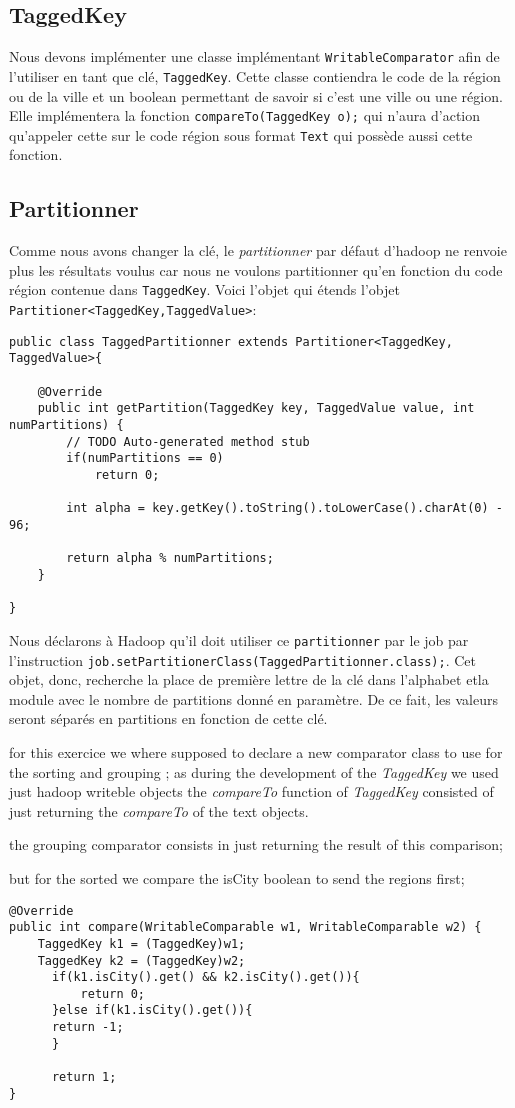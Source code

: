 \documentclass[a4paper]{article}
\begin{document}
\subsection{TaggedKey}
Nous devons implémenter une classe implémentant \verb?WritableComparator? afin de l'utiliser en tant que clé, \verb?TaggedKey?. Cette classe contiendra le code de la région ou de la ville et un boolean permettant de savoir si c'est une ville ou une région. Elle implémentera la fonction \verb?compareTo(TaggedKey o);? qui n'aura d'action qu'appeler cette sur le code région sous format \verb?Text? qui possède aussi cette fonction.

\subsection{Partitionner}
Comme nous avons changer la clé, le \textit{partitionner} par défaut d'hadoop ne renvoie plus les résultats voulus car nous ne voulons partitionner qu'en fonction du code région contenue dans \verb?TaggedKey?. Voici l'objet qui étends l'objet \verb?Partitioner<TaggedKey,TaggedValue>?:

\begin{lstlisting}
public class TaggedPartitionner extends Partitioner<TaggedKey, TaggedValue>{

	@Override
	public int getPartition(TaggedKey key, TaggedValue value, int numPartitions) {
		// TODO Auto-generated method stub
		if(numPartitions == 0)
			return 0;
		
		int alpha = key.getKey().toString().toLowerCase().charAt(0) - 96;
		
		return alpha % numPartitions;
	}

}
\end{lstlisting}

Nous déclarons à Hadoop qu'il doit utiliser ce \verb?partitionner? par le job par l'instruction \verb?job.setPartitionerClass(TaggedPartitionner.class);?. Cet objet, donc, recherche la place de première lettre de la clé dans l'alphabet etla module avec le nombre de partitions donné en paramètre. De ce fait, les valeurs seront séparés en partitions en fonction de cette clé.



for this exercice we where supposed to declare a new comparator class to use for
the sorting and grouping ;
as during the development of the \textit{TaggedKey} we used just hadoop writeble
objects the \textit{ compareTo } function of \textit{TaggedKey} consisted of just
returning the \textit{compareTo} of the text objects.

the grouping comparator consists in just returning the result of this comparison;

but for the sorted  we compare the isCity boolean to send the regions first;


\begin{lstlisting}
@Override
public int compare(WritableComparable w1, WritableComparable w2) {
    TaggedKey k1 = (TaggedKey)w1;
    TaggedKey k2 = (TaggedKey)w2;
      if(k1.isCity().get() && k2.isCity().get()){
          return 0;
      }else if(k1.isCity().get()){
      return -1;
      }

      return 1;
}
\end{lstlisting}
\end{document}
